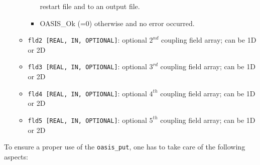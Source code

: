 \begin{itemize}
\begin{itemize}
\begin{itemize}
      restart file and to an output file.
    \item OASIS\_Ok (=0) otherwise and no error occurred.
    \end{itemize}
  \item {\tt fld2 [REAL, IN, OPTIONAL]}: optional $2^{nd}$ coupling
    field array; can be 1D or 2D
  \item {\tt fld3 [REAL, IN, OPTIONAL]}: optional $3^{rd}$ coupling
    field array; can be 1D or 2D
  \item {\tt fld4 [REAL, IN, OPTIONAL]}: optional $4^{th}$ coupling
    field array; can be 1D or 2D
  \item {\tt fld5 [REAL, IN, OPTIONAL]}: optional $5^{th}$ coupling
    field array; can be 1D or 2D
  \end{itemize}
\end{itemize}

To ensure a proper use of the {\tt oasis\_put}, one has to take care
of the following aspects:

